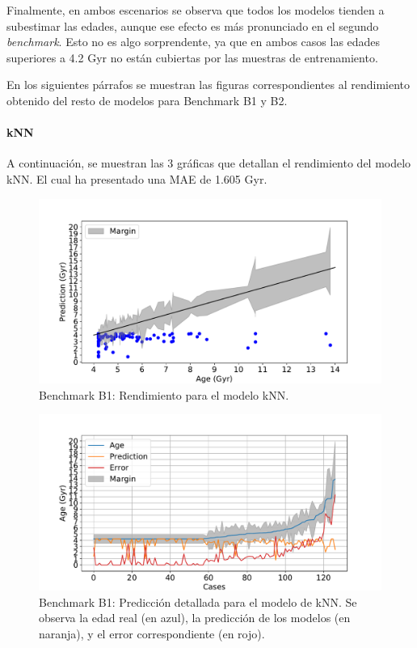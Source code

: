 Finalmente, en ambos escenarios se observa que todos los modelos tienden a subestimar las edades, aunque ese efecto es más pronunciado en el segundo \emph{benchmark}. Esto no es algo sorprendente, ya que en ambos casos las edades superiores a 4.2 Gyr no están cubiertas por las muestras de entrenamiento.

En los siguientes párrafos se muestran las figuras correspondientes al rendimiento obtenido del resto de modelos para Benchmark B1 y B2.

\paragraph{kNN} 
A continuación, se muestran las 3 gráficas que detallan el rendimiento del modelo kNN. El cual ha presentado una MAE de 1.605 Gyr. %

\begin{figure}[H]
\begin{center}
 \includegraphics[width=0.8\linewidth]{Figuras/Experimentos/B_B1_knn_1.pdf}
\end{center}
\caption{Benchmark B1: Rendimiento para el modelo kNN.}
 \label{fig:benchB1_details_knn_1}
\end{figure}

\begin{figure}[H]
\begin{center}
 \includegraphics[width=0.8\linewidth]{Figuras/Experimentos/B_B1_knn_2.pdf}
\end{center}
\caption{Benchmark B1: Predicción detallada para el modelo de kNN. Se observa la edad real (en azul), la predicción de los modelos (en naranja), y el error correspondiente (en rojo).}
 \label{fig:benchB1_details_knn_2}
\end{figure}

